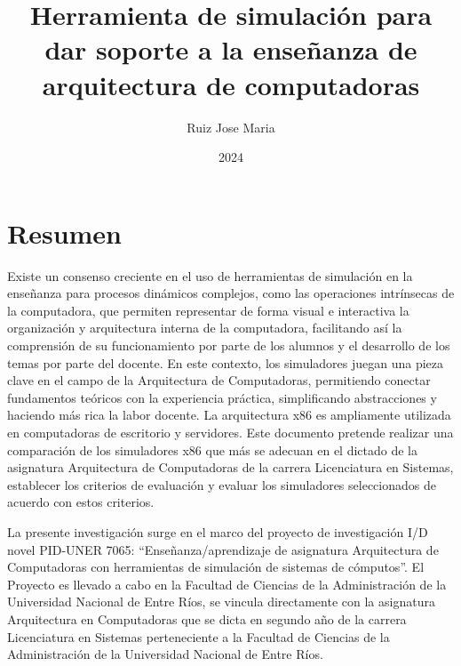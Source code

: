 \documentclass[12pt,twoside]{templates/unerthesis}
\title{Herramienta de simulación para dar soporte a la enseñanza de arquitectura de computadoras}
\author{Ruiz Jose Maria}
\date{2024}
\begin{document}
%


  \maketitle

\frontmatter %
\pagestyle{empty} %



  \setcounter{tocdepth}{1}
  \setlength{\parskip}{0pt}
  \tableofcontents

\setlength\parskip{1em plus 0.1em minus 0.2em}

  \listoftables

  \listoffigures



\mainmatter %
\pagestyle{fancyplain} %

\hypertarget{resumen}{%
\chapter*{Resumen}\label{resumen}}

Existe un consenso creciente en el uso de herramientas de simulación en la enseñanza para procesos dinámicos complejos, como las operaciones intrínsecas de la computadora, que permiten representar de forma visual e interactiva la organización y arquitectura interna de la computadora, facilitando así la comprensión de su funcionamiento por parte de los alumnos y el desarrollo de los temas por parte del docente. En este contexto, los simuladores juegan una pieza clave en el campo de la Arquitectura de Computadoras, permitiendo conectar fundamentos teóricos con la experiencia práctica, simpliﬁcando abstracciones y haciendo más rica la labor docente.
La arquitectura x86 es ampliamente utilizada en computadoras de escritorio y servidores. Este documento pretende realizar una comparación de los simuladores x86 que más se adecuan en el dictado de la asignatura Arquitectura de Computadoras de la carrera Licenciatura en Sistemas, establecer los criterios de evaluación y evaluar los simuladores seleccionados de acuerdo con estos criterios.

La presente investigación surge en el marco del proyecto de investigación I/D novel PID-UNER 7065: ``Enseñanza/aprendizaje de asignatura Arquitectura de Computadoras con herramientas de simulación de sistemas de cómputos''. El Proyecto es llevado a cabo en la Facultad de Ciencias de la Administración de la Universidad Nacional de Entre Ríos, se vincula directamente con la asignatura Arquitectura en Computadoras que se dicta en segundo año de la carrera Licenciatura en Sistemas perteneciente a la Facultad de Ciencias de la Administración de la Universidad Nacional de Entre Ríos.
\end{document}
